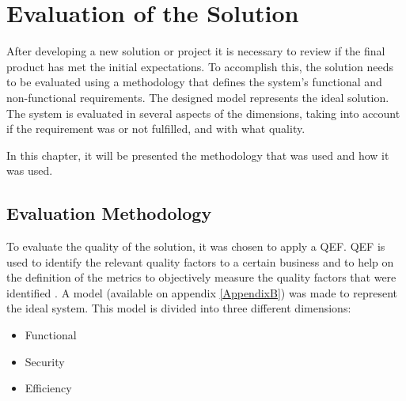 \chapter{Evaluation of the Solution} %
\label{chap:solution_evaluation} 
After developing a new solution or project it is necessary to review if the final product has met the initial expectations. To accomplish this, the solution needs to be evaluated using a methodology that defines the system's functional and non-functional requirements. The designed model represents the ideal solution. The system is evaluated in several aspects of the dimensions, taking into account if the requirement was or not fulfilled, and with what quality.
\par
In this chapter, it will be presented the methodology that was used and how it was used.

\section{Evaluation Methodology}
\label{sec:evaluation_methodology}
To evaluate the quality of the solution, it was chosen to apply a \gls{QEF}. \gls{QEF} is used to identify the relevant quality factors to a certain business and to help on the definition of the metrics to objectively measure the quality factors that were identified \parencite{qef}. A model (available on appendix \ref{AppendixB}) was made to represent the ideal system. This model is divided into three different dimensions:  
\begin{itemize}
    \item Functional
    \item Security
    \item Efficiency
\end{itemize}

